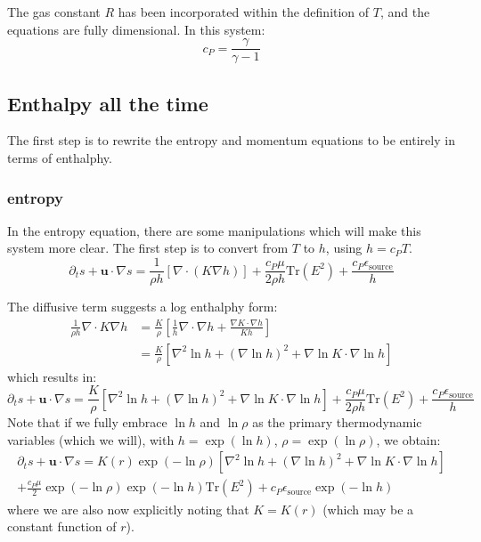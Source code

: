 \documentclass{aastex631}
\newcommand{\del}{\nabla}
\renewcommand{\vec}{\boldsymbol}
\begin{document}
The gas constant $R$ has been incorporated within the definition of $T$, and the equations are fully dimensional.  In this system:
\begin{equation}
  c_P = \frac{\gamma}{\gamma - 1}
\end{equation}



\subsection{Enthalpy all the time}
The first step is to rewrite the entropy and momentum equations to be entirely in terms of enthalphy.

\subsubsection{entropy}
In the entropy equation, there are some manipulations which will make this system more clear.  The first step is to convert from $T$ to $h$, using $h = c_P T$.
\begin{equation}
  \partial_t s + \vec{u}\cdot \del s = \frac{1}{\rho h}\left[\del \cdot (K \del h)\right] + \frac{c_P \mu}{2 \rho h}\mathrm{Tr}(E^2) + \frac{c_P \epsilon_\mathrm{source}}{h}
\end{equation}

The diffusive term suggests a log enthalphy form:
\begin{align}
  \frac{1}{\rho h}\del\cdot K \del h &= \frac{K}{\rho}\left[\frac{1}{h}\del\cdot\del h + \frac{\del K \cdot \del h}{K h} \right] \\
  & = \frac{K}{\rho}\left[\nabla^2 \ln h + \left(\nabla \ln h\right)^2 + \del \ln K \cdot \del \ln h \right]
\end{align}
which results in:
\begin{equation}
  \partial_t s + \vec{u}\cdot \del s = \frac{K}{\rho}\left[\nabla^2 \ln h + \left(\nabla \ln h\right)^2 + \del \ln K \cdot \del \ln h \right] + \frac{c_P \mu}{2 \rho h}\mathrm{Tr}(E^2) + \frac{c_P \epsilon_\mathrm{source}}{h}
\end{equation}
Note that if we fully embrace $\ln h$ and $\ln \rho$ as the primary thermodynamic variables (which we will), with $h = \exp(\ln h)$, $\rho = \exp(\ln \rho)$, we obtain:
\begin{multline}
  \partial_t s + \vec{u}\cdot \del s = K(r) \exp(-\ln \rho)\left[\nabla^2 \ln h + \left(\nabla \ln h\right)^2 + \del \ln K \cdot \del \ln h \right] \\ + \frac{c_P \mu}{2} \exp(-\ln \rho) \exp(-\ln h)\mathrm{Tr}(E^2) + c_P \epsilon_\mathrm{source} \exp(-\ln h)
\end{multline}
where we are also now explicitly noting that $K=K(r)$ (which may be a constant function of $r$).
\end{document}
